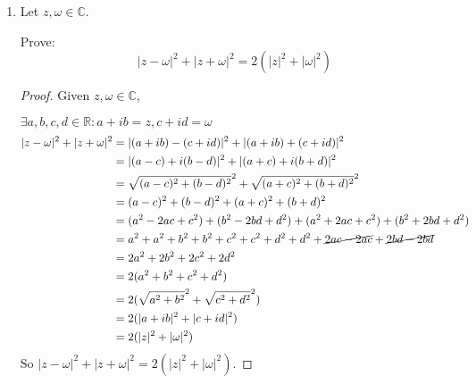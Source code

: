 \documentclass[12pt,letterpaper]{article}
\begin{document}
\begin{enumerate}
\begin{proof}
        Now let's subtract the first equation from the second.
        \[adx_2 - bcx_2 = (ad - bc)x_2 = 0\]

        Again, we assumed that $ad - bc \neq 0$ so we divide by $ad - bc$.
        \[x_2 = 0\]

        So $x_1 = x_2 = 0$.
        Thus if $ad - bc \neq 0$, then $x_1 = x_2 = 0$.

      \end{proof}

    \item
      Let $z, \omega \in \mathbb{C}$.

      Prove:
      \[|z - \omega|^2 + |z + \omega|^2 = 2(|z|^2 + |\omega|^2)\]

      \begin{proof}
        Given $z, \omega \in \mathbb{C}$,

        $\exists a, b, c, d \in \mathbb{R} : a + ib = z, c + id = \omega$
        \begin{align*}
          |z - \omega|^2 + |z + \omega|^2 &=
            |(a + ib) - (c + id)|^2 + |(a + ib) + (c + id)|^2 \\
          &= |(a - c) + i(b - d)|^2 + |(a + c) + i(b + d)|^2 \\
          &= \sqrt{(a - c)^2 + (b - d)^2}^2 + \sqrt{(a + c)^2 + (b + d)^2}^2 \\
          &= (a - c)^2 + (b - d)^2 + (a + c)^2 + (b + d)^2 \\
          &= (a^2 - 2ac + c^2) + (b^2 - 2bd + d^2) + (a^2 + 2ac + c^2) + (b^2 + 2bd + d^2) \\
          &= a^2 + a^2 + b^2 + b^2 + c^2 + c^2 + d^2 + d^2 + \cancel{2ac - 2ac} + \cancel{2bd - 2bd} \\
          &= 2a^2 + 2b^2 + 2c^2 + 2d^2 \\
          &= 2(a^2 + b^2 + c^2 + d^2) \\
          &= 2(\sqrt{a^2 + b^2}^2 + \sqrt{c^2 + d^2}^2) \\
          &= 2(|a + ib|^2 + |c + id|^2) \\
          &= 2(|z|^2 + |\omega|^2)
        \end{align*}
        So $|z - \omega|^2 + |z + \omega|^2 = 2(|z|^2 + |\omega|^2)$.
      \end{proof}
  \end{enumerate}
\end{document}
